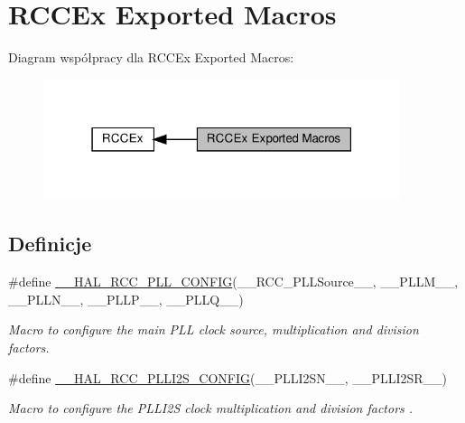 \hypertarget{group___r_c_c_ex___exported___macros}{}\section{R\+C\+C\+Ex Exported Macros}
\label{group___r_c_c_ex___exported___macros}
Diagram współpracy dla R\+C\+C\+Ex Exported Macros\+:\nopagebreak
\begin{figure}[H]
\begin{center}
\leavevmode
\includegraphics[width=295pt]{group___r_c_c_ex___exported___macros}
\end{center}
\end{figure}
\subsection*{Definicje}
\begin{DoxyCompactItemize}
\item 
\#define \hyperlink{group___r_c_c_ex___exported___macros_ga56d9ad48b28e7aa4ad3aadca5b4fd431}{\+\_\+\+\_\+\+H\+A\+L\+\_\+\+R\+C\+C\+\_\+\+P\+L\+L\+\_\+\+C\+O\+N\+F\+IG}(\+\_\+\+\_\+\+R\+C\+C\+\_\+\+P\+L\+L\+Source\+\_\+\+\_\+,  \+\_\+\+\_\+\+P\+L\+L\+M\+\_\+\+\_\+,  \+\_\+\+\_\+\+P\+L\+L\+N\+\_\+\+\_\+,  \+\_\+\+\_\+\+P\+L\+L\+P\+\_\+\+\_\+,  \+\_\+\+\_\+\+P\+L\+L\+Q\+\_\+\+\_\+)
\begin{DoxyCompactList}\small\item\em Macro to configure the main P\+LL clock source, multiplication and division factors. \end{DoxyCompactList}\item 
\#define \hyperlink{group___r_c_c_ex___exported___macros_ga5a2fa2687b621f6eda72457d09715298}{\+\_\+\+\_\+\+H\+A\+L\+\_\+\+R\+C\+C\+\_\+\+P\+L\+L\+I2\+S\+\_\+\+C\+O\+N\+F\+IG}(\+\_\+\+\_\+\+P\+L\+L\+I2\+S\+N\+\_\+\+\_\+,  \+\_\+\+\_\+\+P\+L\+L\+I2\+S\+R\+\_\+\+\_\+)
\begin{DoxyCompactList}\small\item\em Macro to configure the P\+L\+L\+I2S clock multiplication and division factors . \end{DoxyCompactList}\end{DoxyCompactItemize}


